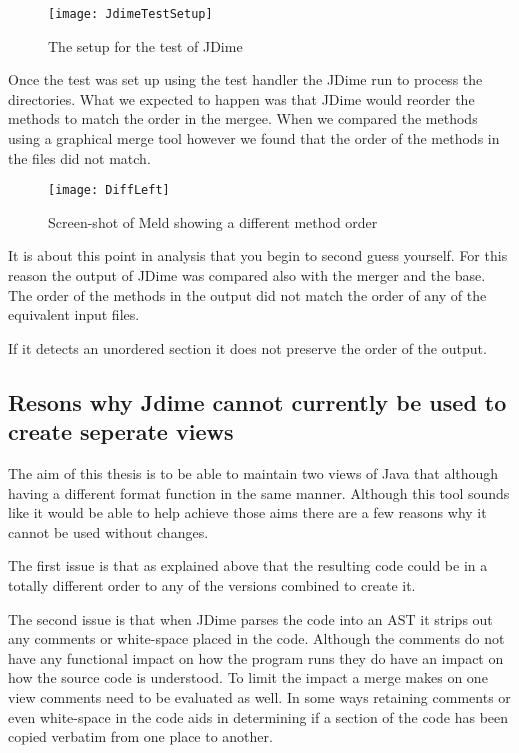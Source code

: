 \begin{figure}[h]
\begin{center}
\texttt{[image: JdimeTestSetup]}
\end{center}
 \caption{The setup for the test of JDime}
\end{figure}

Once the test was set up using the test handler the JDime run to process the directories.
What we expected to happen was that JDime would reorder the methods to match the order in the mergee. When we compared the methods using a graphical merge tool however we found that the order of the methods in the files did not match.

\begin{figure}[h]
\begin{center}
\texttt{[image: DiffLeft]}
\end{center}
 \caption{Screen-shot of Meld showing a different method order}
\end{figure}

It is about this point in analysis that you begin to second guess yourself.  For this reason the output of JDime was compared also with the merger and the base.  The order of the methods in the output did not match the order of any of the equivalent input files.  

If it detects an unordered section it does not preserve the order of the output.

\subsection{Resons why Jdime cannot currently be used to create seperate views}
The aim of this thesis is to be able to maintain two views of Java that although having a different format function in the same manner.  Although this tool sounds like it would be able to help achieve those aims there are a few reasons why it cannot be used without changes.

The first issue is that as explained above that the resulting code could be in a totally different order to any of the versions combined to create it.

The second issue is that when JDime parses the code into an AST it strips out any comments or white-space placed in the code.  Although the comments do not have any functional impact on how the program runs they do have an impact on how the source code is understood.  To limit the impact a merge makes on one view comments need to be evaluated as well. In some ways retaining comments or even white-space in the code aids in determining if a section of the code has been copied verbatim from one place to another.

